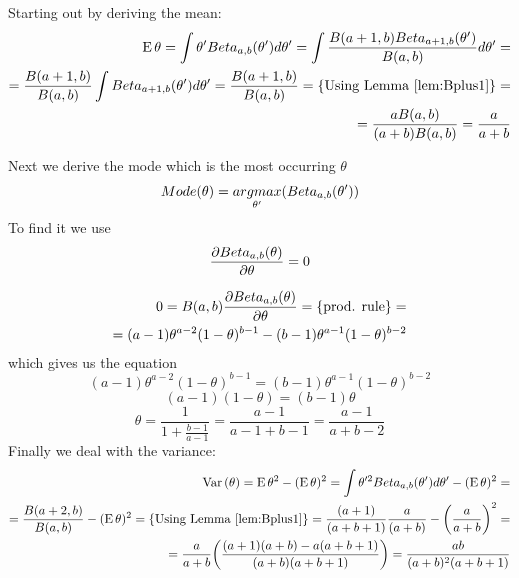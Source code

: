 \documentclass[a4paper,twoside=false,abstract=false,numbers=noenddot,
titlepage=false,headings=small,parskip=half,version=last]{scrartcl}
\begin{document}
\begin{solution}
    Starting out by deriving the mean: 
    \begin{equation}
        \begin{split}
            {\rm E}\,\theta = \int\theta'Beta_{a,b}(\theta')d\theta' =
            \int\frac{B(a+1,b)Beta_{a+1,b}(\theta')}{B(a,b)}d\theta' = \\
            = \frac{B(a+1,b)}{B(a,b)}\int{Beta_{a+1,b}(\theta')d\theta'} =
            \frac{B(a+1,b)}{B(a,b)} = \{\text{Using Lemma \ref{lem:Bplus1}}\}=\\
            =\frac{aB(a,b)}{(a+b)B(a,b)}=\frac{a}{a+b}
        \end{split}
    \end{equation}
    
    Next we derive the mode which is the most occurring $\theta$
    \begin{equation}
        Mode(\theta)=\underset{\theta'}{argmax}(Beta_{a,b}(\theta'))
    \end{equation}
    To find it we use
    \begin{equation}
        \frac{\partial{Beta_{a,b}(\theta)}}{\partial{\theta}}=0
    \end{equation}

    \begin{equation}
        \begin{split}
            0=B(a,b)\frac{\partial{Beta_{a,b}(\theta)}}{\partial{\theta}}=\{\text{prod. rule}\}= \\
            =(a-1)\theta^{a-2}(1-\theta)^{b-1}-(b-1)\theta^{a-1}(1-\theta)^{b-2}
        \end{split}
    \end{equation}
    which gives us the equation
    \begin{equation}
        (a-1)\theta^{a-2}(1-\theta)^{b-1}=(b-1)\theta^{a-1}(1-\theta)^{b-2}
    \end{equation}
    \begin{equation}
        (a-1)(1-\theta)=(b-1)\theta 
    \end{equation}
    \begin{equation}
        \theta=\frac{1}{1+\frac{b-1}{a-1}}=\frac{a-1}{a-1+b-1}=\frac{a-1}{a+b-2} 
    \end{equation}
    Finally we deal with the variance: 
    \begin{equation}
        \begin{split}
            {\rm Var}\,(\theta)={\rm E}\,\theta^2 - ({\rm E}\,\theta)^2=
            \int\theta'^2 Beta_{a,b}(\theta')d\theta' - ({\rm E}\,\theta)^2= \\
            = \frac{B(a+2,b)}{B(a,b)} - ({\rm E}\,\theta)^2 = \{\text{Using
            Lemma \ref{lem:Bplus1}}\}=
            \frac{(a+1)}{(a+b+1)}\frac{a}{(a+b)} - \bigg(\frac{a}{a+b}\bigg)^2 =
            \\
            = \frac{a}{a+b}\bigg(\frac{(a+1)(a+b)-a(a+b+1)}{(a+b)(a+b+1)}\bigg)
            = \frac{ab}{(a+b)^2(a+b+1)}
        \end{split}    
    \end{equation}

\end{solution}
\end{document}
